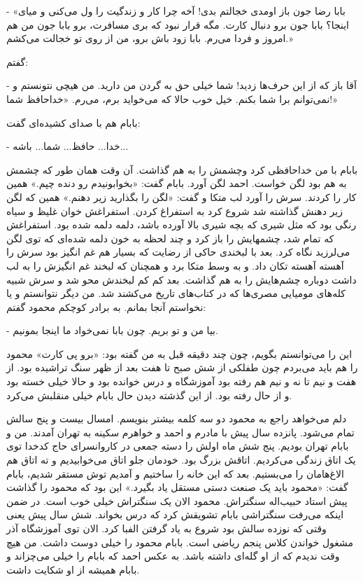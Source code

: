 \documentclass[12pt,a4paper]{book}
\begin{document}
- «بابا رضا جون باز اومدی خجالتم بدی! آخه چرا کار و زندگیت را ول می‌کنی و میای اینجا؟ بابا جون برو دنبال کارت. مگه قرار نبود که بری مسافرت، برو بابا جون من هم امروز و فردا می‌رم. بابا زود باش برو، من از روی تو خجالت می‌کشم.»

گفتم:

- آقا باز که از این حرف‌ها زدید! شما خیلی حق به گردن من دارید. من هیچی نتونستم و نمی‌توانم برا شما بکنم. خیل خوب حالا که می‌خواید برم، می‌رم. «خداحافظ شما!»

بابام هم با صدای کشیده‌ای گفت:

- خدا... حافظ... شما... باشه... 
 
بابام با من خداحافظی کرد وچشمش را به هم گذاشت. آن وقت همان طور که چشمش به هم بود لگن خواست. احمد لگن آورد. بابام گفت: «بخوابونیدم رو دنده چپم.» همین کار را کردند. سرش را آورد لب متکا و گفت: «لگن را بگذارید زیر دهنم.» همین که لگن زیر دهنش گذاشته شد شروع کرد به استفراغ کردن. استفراغش خوان غلیظ و سیاه رنگی بود که مثل شیری که بچه شیری بالا آورده باشد، دلمه دلمه شده بود. استفراغش که تمام شد، چشمهایش را باز کرد و چند لحظه به خون دلمه شده‌ای که توی لگن می‌لرزید نگاه کرد. بعد با لبخندی حاکی از رضایت که بسیار هم غم انگیز بود سرش را آهسته آهسته تکان داد. و به وسط متکا برد و همچنان که لبخند غم انگیزش را به لب داشت دوباره چشم‌هایش را به هم گذاشت. بعد کم کم لبخندش محو شد و سرش شبیه کله‌های مومیایی مصری‌ها که در کتاب‌های تاریخ می‌کشند شد. من دیگر نتوانستم و یا نخواستم آنجا بمانم. به برادر کوچکم محمود گفتم:

- بیا من و تو بریم. چون بابا نمی‌خواد ما اینجا بمونیم.

این را می‌توانستم بگویم، چون چند دقیقه قبل به من گفته بود: «برو پی کارت» محمود را هم باید می‌بردم چون طفلکی از شش صبح تا هفت بعد از ظهر سنگ تراشیده بود. از هفت و نیم تا نه و نیم هم رفته بود آموزشگاه و درس خوانده بود و حالا خیلی خسته بود و از حال رفته بود. از این گذشته دیدن حال بابام خیلی منقلبش می‌کرد.

دلم می‌خواهد راجع به محمود دو سه کلمه بیشتر بنویسم. امسال بیست و پنج سالش تمام می‌شود. پانزده سال پیش با مادرم و احمد و خواهرم سکینه به تهران آمدند. من و بابام تهران بودیم. پنج شش ماه اولش را دسته جمعی در کاروانسرای حاج کدخدا توی یک اتاق زندگی می‌کردیم. اتاقش بزرگ بود. خودمان جلو اتاق می‌خوابیدیم و ته اتاق هم الاغ‌هامان را می‌بستیم. بعد که این خانه را ساختیم و آمدیم توش مستقر شدیم، بابام گفت: «محمود باید یک صنعت دستی مستقل یاد بگیرد.» این بود که محمود را گذاشت پیش استاد حبیب‌اله سنگتراش. محمود الان یک سنگتراش خیلی خوب است. در ضمن اینکه می‌رفت سنگتراشی بابام تشویقش کرد که درس بخواند. شش سال پیش یعنی وقتی که نوزده سالش بود شروع به یاد گرفتن الفبا کرد. الان توی آموزشگاه آذر مشغول خواندن کلاس پنجم ریاضی است. بابام محمود را خیلی دوست داشت. من هیچ وقت ندیدم که از او گله‌ای داشته باشد. به عکس احمد که بابام را خیلی می‌چزاند و بابام همیشه از او شکایت داشت.
\end{document}
